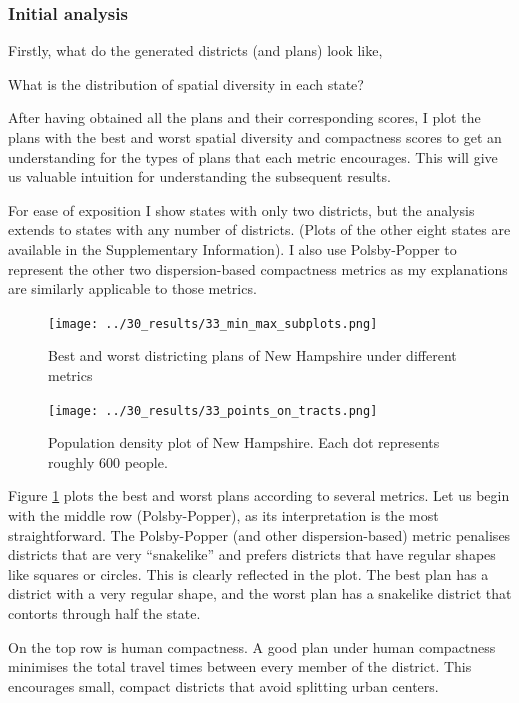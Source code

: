 \documentclass[]{article}
\begin{document}
\hypertarget{initial-analysis}{%
\subsubsection{Initial analysis}\label{initial-analysis}}

Firstly, what do the generated districts (and plans) look like,

What is the distribution of spatial diversity in each state?

After having obtained all the plans and their corresponding scores, I
plot the plans with the best and worst spatial diversity and compactness
scores to get an understanding for the types of plans that each metric
encourages. This will give us valuable intuition for understanding the
subsequent results.

For ease of exposition I show states with only two districts, but the
analysis extends to states with any number of districts. (Plots of the
other eight states are available in the Supplementary Information). I
also use Polsby-Popper to represent the other two dispersion-based
compactness metrics as my explanations are similarly applicable to those
metrics.

\begin{figure}
\centering
\texttt{[image: ../30\_results/33\_min\_max\_subplots.png]}
\caption{Best and worst districting plans of New Hampshire under
different metrics \label{nh_minmax}}
\end{figure}

\begin{figure}
\centering
\texttt{[image: ../30\_results/33\_points\_on\_tracts.png]}
\caption{Population density plot of New Hampshire. Each dot represents
roughly 600 people. \label{nh_density}}
\end{figure}

Figure \ref{nh_minmax} plots the best and worst plans according to
several metrics. Let us begin with the middle row (Polsby-Popper), as
its interpretation is the most straightforward. The Polsby-Popper (and
other dispersion-based) metric penalises districts that are very
``snakelike'' and prefers districts that have regular shapes like
squares or circles. This is clearly reflected in the plot. The best plan
has a district with a very regular shape, and the worst plan has a
snakelike district that contorts through half the state.

On the top row is human compactness. A good plan under human compactness
minimises the total travel times between every member of the district.
This encourages small, compact districts that avoid splitting urban
centers.
\end{document}
